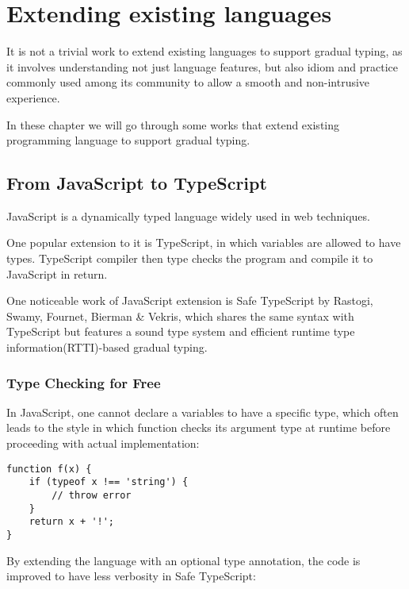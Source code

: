 
\renewcommand{\thechapter}{2}

\chapter{Extending existing languages}

It is not a trivial work to extend existing languages to support gradual typing,
as it involves understanding not just language features,
but also idiom and practice commonly used among its community to allow
a smooth and non-intrusive experience.

In these chapter we will go through some works that extend existing programming
language to support gradual typing.

\section{From JavaScript to TypeScript}

JavaScript is a dynamically typed language widely used in web techniques.


One popular extension to it is TypeScript, in which variables are allowed to
have types. TypeScript compiler then type checks the program and compile it to JavaScript
in return.

One noticeable work of JavaScript extension is Safe TypeScript by Rastogi, Swamy, Fournet, Bierman \& Vekris, which shares the same syntax with TypeScript
but features a sound type system and efficient runtime type information(RTTI)-based
gradual typing.

\subsection{Type Checking for Free}

In JavaScript, one cannot declare a variables to have a specific type,
which often leads to the style in which function checks its argument type at runtime
before proceeding with actual implementation:

\begin{verbatim}
function f(x) {
    if (typeof x !== 'string') {
        // throw error
    }
    return x + '!';
}
\end{verbatim}

By extending the language with an optional type annotation,
the code is improved to have less verbosity in Safe TypeScript: 

